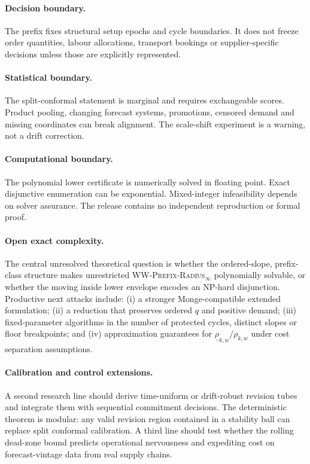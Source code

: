 \documentclass[11pt]{article}
\theoremstyle{definition}
\newcommand{\WWR}{\textsc{WW-Prefix-Radius}\ensuremath{_{\infty}}}
\begin{document}
\paragraph{Decision boundary.}
The prefix fixes structural setup epochs and cycle boundaries. It does not freeze order quantities, labour allocations, transport bookings or supplier-specific decisions unless those are explicitly represented.

\paragraph{Statistical boundary.}
The split-conformal statement is marginal and requires exchangeable scores. Product pooling, changing forecast systems, promotions, censored demand and missing coordinates can break alignment. The scale-shift experiment is a warning, not a drift correction.

\paragraph{Computational boundary.}
The polynomial lower certificate is numerically solved in floating point. Exact disjunctive enumeration can be exponential. Mixed-integer infeasibility depends on solver assurance. The release contains no independent reproduction or formal proof.

\paragraph{Open exact complexity.}
The central unresolved theoretical question is whether the ordered-slope, prefix-class structure makes unrestricted \WWR{} polynomially solvable, or whether the moving inside lower envelope encodes an NP-hard disjunction. Productive next attacks include: (i) a stronger Monge-compatible extended formulation; (ii) a reduction that preserves ordered $q$ and positive demand; (iii) fixed-parameter algorithms in the number of protected cycles, distinct slopes or floor breakpoints; and (iv) approximation guarantees for $\underline\rho_{k,w}/\rho_{k,w}$ under cost separation assumptions.

\paragraph{Calibration and control extensions.}
A second research line should derive time-uniform or drift-robust revision tubes and integrate them with sequential commitment decisions. The deterministic theorem is modular: any valid revision region contained in a stability ball can replace split conformal calibration. A third line should test whether the rolling dead-zone bound predicts operational nervousness and expediting cost on forecast-vintage data from real supply chains.
\end{document}
